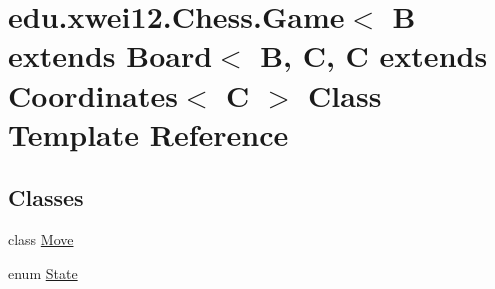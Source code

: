 \hypertarget{classedu_1_1xwei12_1_1_chess_1_1_game}{}\section{edu.\+xwei12.\+Chess.\+Game$<$ B extends Board$<$ B, C, C extends Coordinates$<$ C $>$ Class Template Reference}
\label{classedu_1_1xwei12_1_1_chess_1_1_game}
\subsection*{Classes}
\begin{DoxyCompactItemize}
\item 
class \hyperlink{classedu_1_1xwei12_1_1_chess_1_1_game_1_1_move}{Move}
\item 
enum \hyperlink{enumedu_1_1xwei12_1_1_chess_1_1_game_1_1_state}{State}
\end{DoxyCompactItemize}
